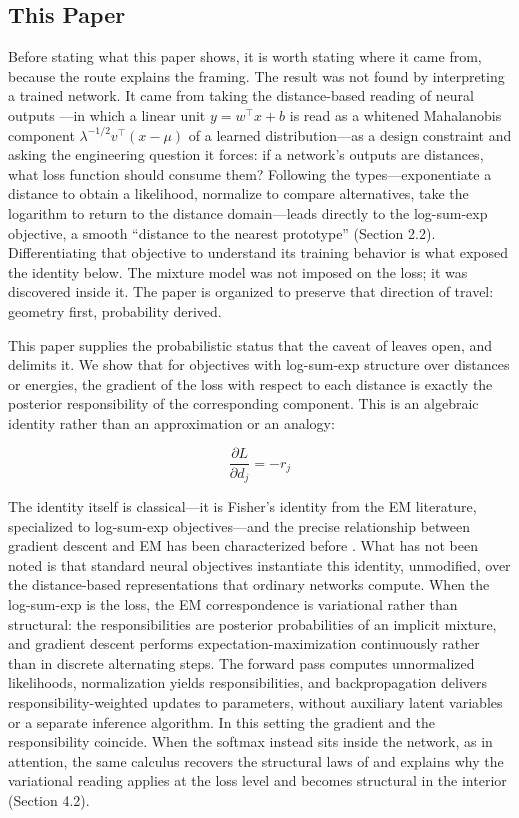 \subsection{This Paper}

Before stating what this paper shows, it is worth stating where it came from, because the route explains the framing. The result was not found by interpreting a trained network. It came from taking the distance-based reading of neural outputs \citep{oursland2024interpreting}---in which a linear unit $y = w^\top x + b$ is read as a whitened Mahalanobis component $\lambda^{-1/2} v^\top (x - \mu)$ of a learned distribution---as a design constraint and asking the engineering question it forces: if a network's outputs are distances, what loss function should consume them? Following the types---exponentiate a distance to obtain a likelihood, normalize to compare alternatives, take the logarithm to return to the distance domain---leads directly to the log-sum-exp objective, a smooth ``distance to the nearest prototype'' (Section 2.2). Differentiating that objective to understand its training behavior is what exposed the identity below. The mixture model was not imposed on the loss; it was discovered inside it. The paper is organized to preserve that direction of travel: geometry first, probability derived.

This paper supplies the probabilistic status that the caveat of \citet{agarwal2025gradient} leaves open, and delimits it. We show that for objectives with log-sum-exp structure over distances or energies, the gradient of the loss with respect to each distance is exactly the posterior responsibility of the corresponding component. This is an algebraic identity rather than an approximation or an analogy:

\begin{equation}
\frac{\partial L}{\partial d_j} = -r_j
\end{equation}

The identity itself is classical---it is Fisher's identity from the EM literature, specialized to log-sum-exp objectives---and the precise relationship between gradient descent and EM has been characterized before \citep{xu1996convergence,neal1998view}. What has not been noted is that standard neural objectives instantiate this identity, unmodified, over the distance-based representations that ordinary networks compute. When the log-sum-exp is the loss, the EM correspondence is variational rather than structural: the responsibilities are posterior probabilities of an implicit mixture, and gradient descent performs expectation-maximization continuously rather than in discrete alternating steps. The forward pass computes unnormalized likelihoods, normalization yields responsibilities, and backpropagation delivers responsibility-weighted updates to parameters, without auxiliary latent variables or a separate inference algorithm. In this setting the gradient and the responsibility coincide. When the softmax instead sits inside the network, as in attention, the same calculus recovers the structural laws of \citet{agarwal2025gradient} and explains why the variational reading applies at the loss level and becomes structural in the interior (Section 4.2).

